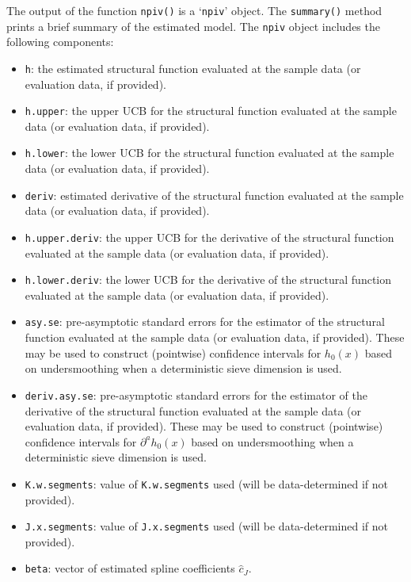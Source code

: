 \documentclass[
]{jss}
\begin{document}
The output of the function \texttt{npiv()} is a `\texttt{npiv}' object.
The \texttt{summary()} method prints a brief summary of the estimated
model. The \texttt{npiv} object includes the following components:

\begin{itemize}
\item
  \texttt{h}: the estimated structural function evaluated at the sample
  data (or evaluation data, if provided).
\item
  \texttt{h.upper}: the upper UCB for the structural function evaluated
  at the sample data (or evaluation data, if provided).
\item
  \texttt{h.lower}: the lower UCB for the structural function evaluated
  at the sample data (or evaluation data, if provided).
\item
  \texttt{deriv}: estimated derivative of the structural function
  evaluated at the sample data (or evaluation data, if provided).
\item
  \texttt{h.upper.deriv}: the upper UCB for the derivative of the
  structural function evaluated at the sample data (or evaluation data,
  if provided).
\item
  \texttt{h.lower.deriv}: the lower UCB for the derivative of the
  structural function evaluated at the sample data (or evaluation data,
  if provided).
\item
  \texttt{asy.se}: pre-asymptotic standard errors for the estimator of
  the structural function evaluated at the sample data (or evaluation
  data, if provided). These may be used to construct (pointwise)
  confidence intervals for \(h_0(x)\) based on undersmoothing when a
  deterministic sieve dimension is used.
\item
  \texttt{deriv.asy.se}: pre-asymptotic standard errors for the
  estimator of the derivative of the structural function evaluated at
  the sample data (or evaluation data, if provided). These may be used
  to construct (pointwise) confidence intervals for
  \(\partial^a h_0(x)\) based on undersmoothing when a deterministic
  sieve dimension is used.
\item
  \texttt{K.w.segments}: value of \texttt{K.w.segments} used (will be
  data-determined if not provided).
\item
  \texttt{J.x.segments}: value of \texttt{J.x.segments} used (will be
  data-determined if not provided).
\item
  \texttt{beta}: vector of estimated spline coefficients \(\hat c_J\).
\end{itemize}
\end{document}
